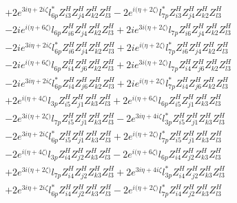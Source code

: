 \begin{align}
 &+2 e^{3 i \eta +2 i \zeta } l_{6p}^* Z_{{i 3}}^{H} Z_{{j 4}}^{H} Z_{{k 2}}^{H} Z_{{l 3}}^{H} -2 e^{i \Big(\eta +2 \zeta \Big)} l_{7p}^* Z_{{i 3}}^{H} Z_{{j 4}}^{H} Z_{{k 2}}^{H} Z_{{l 3}}^{H} \nonumber \\ 
 &-2 i e^{i \Big(\eta +6 \zeta \Big)} l_{6p} Z_{{i 6}}^{H} Z_{{j 4}}^{H} Z_{{k 2}}^{H} Z_{{l 3}}^{H} +2 i e^{3 i \Big(\eta +2 \zeta \Big)} l_{7p} Z_{{i 6}}^{H} Z_{{j 4}}^{H} Z_{{k 2}}^{H} Z_{{l 3}}^{H} \nonumber \\ 
 &-2 i e^{3 i \eta +2 i \zeta } l_{6p}^* Z_{{i 6}}^{H} Z_{{j 4}}^{H} Z_{{k 2}}^{H} Z_{{l 3}}^{H} +2 i e^{i \Big(\eta +2 \zeta \Big)} l_{7p}^* Z_{{i 6}}^{H} Z_{{j 4}}^{H} Z_{{k 2}}^{H} Z_{{l 3}}^{H} \nonumber \\ 
 &-2 i e^{i \Big(\eta +6 \zeta \Big)} l_{6p} Z_{{i 4}}^{H} Z_{{j 6}}^{H} Z_{{k 2}}^{H} Z_{{l 3}}^{H} +2 i e^{3 i \Big(\eta +2 \zeta \Big)} l_{7p} Z_{{i 4}}^{H} Z_{{j 6}}^{H} Z_{{k 2}}^{H} Z_{{l 3}}^{H} \nonumber \\ 
 &-2 i e^{3 i \eta +2 i \zeta } l_{6p}^* Z_{{i 4}}^{H} Z_{{j 6}}^{H} Z_{{k 2}}^{H} Z_{{l 3}}^{H} +2 i e^{i \Big(\eta +2 \zeta \Big)} l_{7p}^* Z_{{i 4}}^{H} Z_{{j 6}}^{H} Z_{{k 2}}^{H} Z_{{l 3}}^{H} \nonumber \\ 
 &+2 e^{i \Big(\eta +4 \zeta \Big)} l_{3p} Z_{{i 5}}^{H} Z_{{j 1}}^{H} Z_{{k 3}}^{H} Z_{{l 3}}^{H} +2 e^{i \Big(\eta +6 \zeta \Big)} l_{6p} Z_{{i 5}}^{H} Z_{{j 1}}^{H} Z_{{k 3}}^{H} Z_{{l 3}}^{H} \nonumber \\ 
 &-2 e^{3 i \Big(\eta +2 \zeta \Big)} l_{7p} Z_{{i 5}}^{H} Z_{{j 1}}^{H} Z_{{k 3}}^{H} Z_{{l 3}}^{H} -2 e^{3 i \eta +4 i \zeta } l_{3p}^* Z_{{i 5}}^{H} Z_{{j 1}}^{H} Z_{{k 3}}^{H} Z_{{l 3}}^{H} \nonumber \\ 
 &-2 e^{3 i \eta +2 i \zeta } l_{6p}^* Z_{{i 5}}^{H} Z_{{j 1}}^{H} Z_{{k 3}}^{H} Z_{{l 3}}^{H} +2 e^{i \Big(\eta +2 \zeta \Big)} l_{7p}^* Z_{{i 5}}^{H} Z_{{j 1}}^{H} Z_{{k 3}}^{H} Z_{{l 3}}^{H} \nonumber \\ 
 &-2 e^{i \Big(\eta +4 \zeta \Big)} l_{3p} Z_{{i 4}}^{H} Z_{{j 2}}^{H} Z_{{k 3}}^{H} Z_{{l 3}}^{H} -2 e^{i \Big(\eta +6 \zeta \Big)} l_{6p} Z_{{i 4}}^{H} Z_{{j 2}}^{H} Z_{{k 3}}^{H} Z_{{l 3}}^{H} \nonumber \\ 
 &+2 e^{3 i \Big(\eta +2 \zeta \Big)} l_{7p} Z_{{i 4}}^{H} Z_{{j 2}}^{H} Z_{{k 3}}^{H} Z_{{l 3}}^{H} +2 e^{3 i \eta +4 i \zeta } l_{3p}^* Z_{{i 4}}^{H} Z_{{j 2}}^{H} Z_{{k 3}}^{H} Z_{{l 3}}^{H} \nonumber \\ 
 &+2 e^{3 i \eta +2 i \zeta } l_{6p}^* Z_{{i 4}}^{H} Z_{{j 2}}^{H} Z_{{k 3}}^{H} Z_{{l 3}}^{H} -2 e^{i \Big(\eta +2 \zeta \Big)} l_{7p}^* Z_{{i 4}}^{H} Z_{{j 2}}^{H} Z_{{k 3}}^{H} Z_{{l 3}}^{H} \nonumber \\ 

\end{align}

